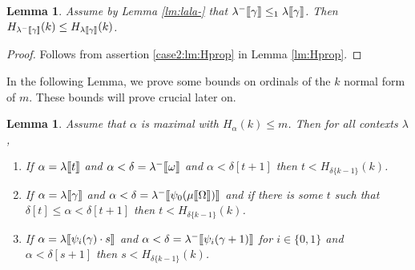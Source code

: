 \documentclass{amsart}
\theoremstyle{plain}
\theoremstyle{plain}
\newtheorem{lemma}[theorem]{Lemma}
\def\scbrl{[\hspace{-.14em}[}
\def\scbrr{]\hspace{-.14em}]}
\def\scbr#1{\scbrl#1\scbrr}
\newcommand{\Om}{{\Omega}}
\newcommand{\al}{{\alpha}}
\newcommand{\ga}{\gamma}
\newcommand{\de}{\delta}
\newcommand{\la}{\lambda}
\newcommand{\om}{\omega}
\def\scbrl{[\hspace{-.14em}[}
\def\scbrr{]\hspace{-.14em}]}
\def\scbr#1{\scbrl#1\scbrr}
\begin{document}
\begin{lemma} \label{lm:MeasureH}
 Assume by Lemma \ref{lm:lala-} that $\la^-\scbr{\ga} \leq_1 \la\scbr{\ga}$. Then $H_{\la^-\scbr{\ga}}(k) \leq H_{\la\scbr{\ga}}(k)$.
\end{lemma}
\begin{proof}
Follows from assertion \ref{case2:lm:Hprop} in Lemma \ref{lm:Hprop}.    
\end{proof}
\smallskip

In the following Lemma, we prove some bounds on ordinals of the $k$ normal form of $m$. These bounds will prove crucial later on.
\begin{lemma}\label{lm:OrdMeasure}
Assume that  $\al$ is maximal with $H_\al(k)\leq m$. Then for all contexts $\la$,
\begin{enumerate}
    \item If $\al = \la\scbr{t}$ and $\al<\de= \la^-\scbr{\om}$ and $\al< \de[t+1]$  then $t <H_{\de\{k-1\}}(k)$.
    
    \item If $\al =\la\scbr{\ga}$ and $\al< \de=\la^-\scbr{\psi_0(\mu\scbr{\Om})}$ and if there is some $t$ such that
    $\de[t]\leq\al<\de[t+1]$ then $t<H_{\de\{k-1\}}(k)$.
    
    \item If $\al = \la\scbr{\psi_i(\ga)\cdot s}$ and $\al < \de = \la^-\scbr{\psi_i(\ga+1)}$  for $i \in \{0,1\}$ and $\al < \de[s+1]$ then $s< H_{\de\{k-1\}}(k)$. 
\end{enumerate}
\end{lemma}
\end{document}
